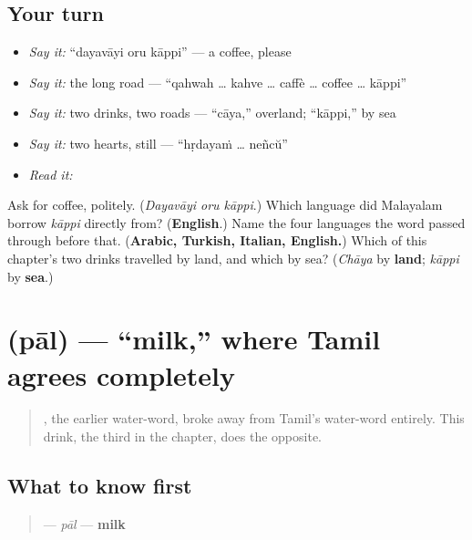 \subsection*{Your turn}
\begin{itemize}
\raggedright
  \item \emph{Say it:} \textquotedblleft{}dayavāyi oru kāppi\textquotedblright{} — a coffee, please
  \item \emph{Say it:} the long road — \textquotedblleft{}qahwah … kahve … caffè … coffee … kāppi\textquotedblright{}
  \item \emph{Say it:} two drinks, two roads — \textquotedblleft{}cāya,\textquotedblright{} overland; \textquotedblleft{}kāppi,\textquotedblright{} by sea
  \item \emph{Say it:} two hearts, still — \textquotedblleft{}hṛdayaṁ … neñcŭ\textquotedblright{}
  \item \emph{Read it:} \textbf{}
\end{itemize}

\begin{tcolorbox}[breakable,colback=teal!4,colframe=teal!35!black,title={Before you move on}]
Ask for coffee, politely. (\emph{Dayavāyi oru kāppi}.) Which language did Malayalam borrow \emph{kāppi} directly from? (\textbf{English}.) Name the four languages the word passed through before that. (\textbf{Arabic, Turkish, Italian, English.}) Which of this chapter's two drinks travelled by land, and which by sea? (\emph{Chāya} by \textbf{land}; \emph{kāppi} by \textbf{sea}.)
\end{tcolorbox}
\section[\texorpdfstring{\ml{പാൽ} (pāl)}{പാൽ (pāl)}]{ (pāl) — \textquotedblleft{}milk,\textquotedblright{} where Tamil agrees completely}

\label{lesson:ML-C39-paal}



\begin{quote}
\textbf{}, the earlier water-word, broke away from Tamil's water-word entirely. This drink, the third in the chapter, does the opposite.
\end{quote}

\subsection*{What to know first}
\begin{quote}
\textbf{} — \emph{pāl} — \textbf{milk}
\end{quote}

